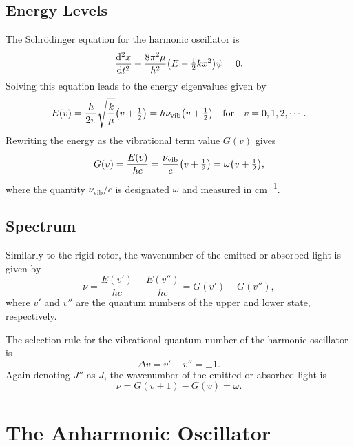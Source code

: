 \documentclass[11pt, twoside, fleqn]{report}
\DeclarePairedDelimiter\p{\lparen}{\rparen}
\newcommand{\odv}{\dv}
\newcommand{\up}{\text}
\begin{document}
\section{Energy Levels}
\label{s:energy_levels_2}

The Schr\"odinger equation for the harmonic oscillator is
\begin{equation*}
    \odv[2]{x}{t} + \frac{8\pi^2\mu}{h^2}\p*{E - \tfrac{1}{2}kx^2}\psi = 0.
\end{equation*}
Solving this equation leads to the energy eigenvalues given by
\begin{equation*}
    E(v) = \frac{h}{2\pi}\sqrt{\frac{k}{\mu}}\p*{v + \tfrac{1}{2}} = h\nu_\up{vib}\p*{v + \tfrac{1}{2}} \quad\text{for}\quad v = 0, 1, 2, \dotsb.
\end{equation*}
Rewriting the energy as the vibrational term value $G(v)$ gives
\begin{equation*}
    G(v) = \frac{E(v)}{hc} = \frac{\nu_\up{vib}}{c}\p*{v + \tfrac{1}{2}} = \omega\p*{v + \tfrac{1}{2}},
\end{equation*}
where the quantity $\nu_\up{vib}/c$ is designated $\omega$ and measured in \unit{cm^{-1}}.

\section{Spectrum}
\label{s:spectrum_2}

Similarly to the rigid rotor, the wavenumber of the emitted or absorbed light is given by
\begin{equation*}
    \nu = \frac{E(v')}{hc} - \frac{E(v'')}{hc} = G(v') - G(v''),
\end{equation*}
where $v'$ and $v''$ are the quantum numbers of the upper and lower state, respectively.

The selection rule for the vibrational quantum number of the harmonic oscillator is
\begin{equation*}
    \Delta{}v = v' - v'' = \pm 1.
\end{equation*}
Again denoting $J''$ as $J$, the wavenumber of the emitted or absorbed light is
\begin{equation*}
    \nu = G(v + 1) - G(v) = \omega.
\end{equation*}

\chapter{The Anharmonic Oscillator}
\label{c:the_anharmonic_oscillator}
\end{document}
